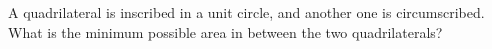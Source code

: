A quadrilateral is inscribed in a unit circle, and another one is circumscribed. What is the minimum possible area in between the two quadrilaterals?
